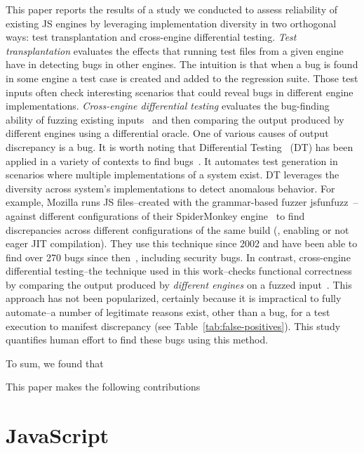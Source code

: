\documentclass[10pt,conference,anonymous]{IEEEtran}
\begin{document}
This paper reports the results of a study we conducted to assess
reliability of existing JS engines by leveraging implementation
diversity in two orthogonal ways: test transplantation and
cross-engine differential testing.  \emph{Test transplantation}
evaluates the effects that running \js{} test files from a given
engine have in detecting bugs in other engines. The intuition is that
when a bug is found in some engine a test case is created and added to
the regression suite. Those test inputs often check interesting
scenarios that could reveal bugs in different engine
implementations. \emph{Cross-engine differential testing} evaluates
the bug-finding ability of fuzzing existing
inputs~\cite{fuzz-testing-history} and then comparing the output
produced by different engines using a differential oracle. One of
various causes of output discrepancy is a bug. It is worth noting that
Differential Testing~\cite{Brumley-etal-ss07} (DT) has been applied in
a variety of contexts to find
bugs~\cite{Yang-etal-pldi11,Chen-etal-fse2015,Argyros-etla-ccs16,Chen-etal-pldi16,petsios-etal-sp2017,SivakornAPKJ17,Zhang:2017:ATD:3097368.3097448}. It
automates test generation in scenarios where multiple implementations
of a system exist. DT leverages the diversity across system's
implementations to detect anomalous behavior. For example, Mozilla
runs JS files--created with the grammar-based fuzzer
jsfunfuzz~\cite{jsfunfuzz}--against different configurations of their
SpiderMonkey engine~\cite{jsfunfuzz-mozilla-bug} to find discrepancies
across different configurations of the same build (\eg{}, enabling or
not eager JIT compilation). They use this technique since 2002 and
have been able to find over 270 bugs since
then~\cite{jsfunfuzz-at-mozilla}, including security bugs.  In
contrast, cross-engine differential testing--the technique used in
this work--checks functional correctness by comparing the output
produced by \emph{different engines} on a fuzzed
input~\cite{patra2016learning}. This approach has not been
popularized, certainly because it is impractical to fully automate--a
number of legitimate reasons exist, other than a bug, for a test
execution to manifest discrepancy (see
Table~\ref{tab:false-positives}). This study quantifies human effort
to find these bugs using this method.

To sum, we found that 

This paper makes the following contributions 

\section{JavaScript}
\label{sec:es6-design}
\label{sec:imp-dep-behavior}
\end{document}
